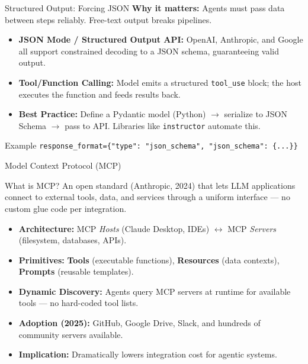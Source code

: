 \documentclass{beamer}       %
\begin{document}
\begin{frame}{Structured Output: Forcing JSON}
    \textbf{Why it matters:} Agents must pass data between steps reliably. Free-text output breaks pipelines.
    \vspace{0.2cm}
    \begin{itemize}
        \item \textbf{JSON Mode / Structured Output API:} OpenAI, Anthropic, and Google all support constrained decoding to a JSON schema, guaranteeing valid output.
        \item \textbf{Tool/Function Calling:} Model emits a structured \texttt{tool\_use} block; the host executes the function and feeds results back.
        \item \textbf{Best Practice:} Define a Pydantic model (Python) $\rightarrow$ serialize to JSON Schema $\rightarrow$ pass to API. Libraries like \texttt{instructor} automate this.
    \end{itemize}
    \begin{exampleblock}{Example}
        \texttt{response\_format=\{"type": "json\_schema", "json\_schema": \{...\}\}}
    \end{exampleblock}
\end{frame}

\begin{frame}{Model Context Protocol (MCP)}
    \begin{block}{What is MCP?}
        An open standard (Anthropic, 2024) that lets LLM applications connect to external tools, data, and services through a uniform interface --- no custom glue code per integration.
    \end{block}
    \vspace{0.2cm}
    \begin{itemize}
        \item \textbf{Architecture:} MCP \emph{Hosts} (Claude Desktop, IDEs) $\leftrightarrow$ MCP \emph{Servers} (filesystem, databases, APIs).
        \item \textbf{Primitives:} \textbf{Tools} (executable functions), \textbf{Resources} (data contexts), \textbf{Prompts} (reusable templates).
        \item \textbf{Dynamic Discovery:} Agents query MCP servers at runtime for available tools --- no hard-coded tool lists.
        \item \textbf{Adoption (2025):} GitHub, Google Drive, Slack, and hundreds of community servers available.
        \item \textbf{Implication:} Dramatically lowers integration cost for agentic systems.
    \end{itemize}
\end{frame}
\end{document}
